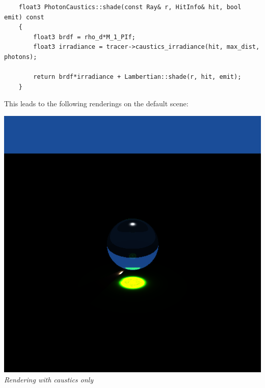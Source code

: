 \documentclass[a4,12pt]{article}
\begin{document}
	\begin{lstlisting}
	float3 PhotonCaustics::shade(const Ray& r, HitInfo& hit, bool emit) const
	{
		float3 brdf = rho_d*M_1_PIf;
		float3 irradiance = tracer->caustics_irradiance(hit, max_dist, photons);
		
		return brdf*irradiance + Lambertian::shade(r, hit, emit);
	}
	\end{lstlisting}
	
	This leads to the following renderings on the default scene:
	
	\begin{center}
		\begin{minipage}[b]{0.40\linewidth}
			\begin{center}
				\includegraphics[width = \textwidth]{./Worksheet7/causticsrender.png}\\
				\textit{Rendering with caustics only}\\
				\vspace{1em}
			\end{center}
		\end{minipage}
		\hspace{0.05\linewidth}
		\begin{minipage}[b]{0.40\linewidth}
			\begin{center}

\end{center}
\end{minipage}
\end{center}
\end{document}
